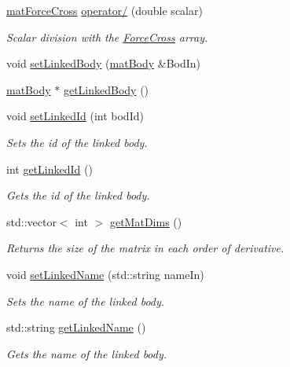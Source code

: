 \begin{DoxyCompactItemize}
\hyperlink{classosea_1_1ofreq_1_1mat_force_cross}{mat\-Force\-Cross} \hyperlink{classosea_1_1ofreq_1_1mat_force_cross_a82b093a301d902c402fe3fe6a2b5b1e9}{operator/} (double scalar)
\begin{DoxyCompactList}\small\item\em Scalar division with the \hyperlink{classosea_1_1ofreq_1_1_force_cross}{Force\-Cross} array. \end{DoxyCompactList}\item 
void \hyperlink{classosea_1_1ofreq_1_1mat_force_cross_a546ca085994682e1e8160ce3014ffaae}{set\-Linked\-Body} (\hyperlink{classosea_1_1ofreq_1_1mat_body}{mat\-Body} \&Bod\-In)
\item 
\hyperlink{classosea_1_1ofreq_1_1mat_body}{mat\-Body} $\ast$ \hyperlink{classosea_1_1ofreq_1_1mat_force_cross_a240be184a1a56ac5541ea0acfbcb9ec5}{get\-Linked\-Body} ()
\item 
void \hyperlink{classosea_1_1ofreq_1_1mat_force_cross_a285c83c27df6413f90665480d2f3a4ed}{set\-Linked\-Id} (int bod\-Id)
\begin{DoxyCompactList}\small\item\em Sets the id of the linked body. \end{DoxyCompactList}\item 
int \hyperlink{classosea_1_1ofreq_1_1mat_force_cross_a613dfb7f1c2d351df3f0e3ab1efc5bfa}{get\-Linked\-Id} ()
\begin{DoxyCompactList}\small\item\em Gets the id of the linked body. \end{DoxyCompactList}\item 
std\-::vector$<$ int $>$ \hyperlink{classosea_1_1ofreq_1_1mat_force_cross_ae842c91c8c3de5c273b2931577e793b4}{get\-Mat\-Dims} ()
\begin{DoxyCompactList}\small\item\em Returns the size of the matrix in each order of derivative. \end{DoxyCompactList}\item 
void \hyperlink{classosea_1_1ofreq_1_1mat_force_cross_a49db04de2e54db7ac3ea43492f45d211}{set\-Linked\-Name} (std\-::string name\-In)
\begin{DoxyCompactList}\small\item\em Sets the name of the linked body. \end{DoxyCompactList}\item 
std\-::string \hyperlink{classosea_1_1ofreq_1_1mat_force_cross_a0afd0f7989ba392c2d5fb8631a6f7def}{get\-Linked\-Name} ()
\begin{DoxyCompactList}\small\item\em Gets the name of the linked body. \end{DoxyCompactList}\end{DoxyCompactItemize}
